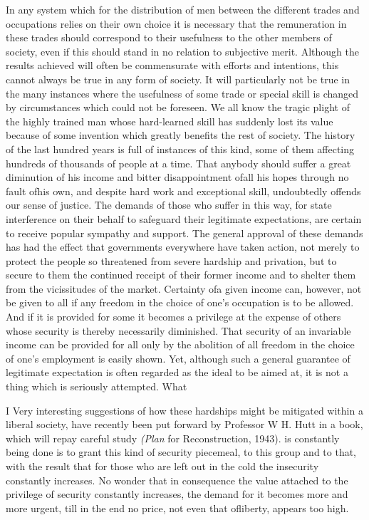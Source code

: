 \documentclass[11pt,openany]{book}
\begin{document}
In any system which for the distribution of men between the different trades and occupations relies on their own choice it is necessary that the remuneration in these trades should correspond to their usefulness to the other members of society, even if this should stand in no relation to subjective merit. Although the results achieved will often be commensurate with efforts and intentions, this cannot always be true in any form of society. It will particularly not be true in the many instances where the usefulness of some trade or special skill is changed by circumstances which could not be foreseen. We all know the tragic plight of the highly trained man whose hard-learned skill has suddenly lost its value because of some invention which greatly benefits the rest of society. The history of the last hundred years is full of instances of this kind, some of them affecting hundreds of thousands of people at a time. That anybody should suffer a great diminution of his income and bitter disappointment ofall his hopes through no fault ofhis own, and despite hard work and exceptional skill, undoubtedly offends our sense of justice. The demands of those who suffer in this way, for state interference on their behalf to safeguard their legitimate expectations, are certain to receive popular sympathy and support. The general approval of these demands has had the effect that governments everywhere have taken action, not merely to protect the people so threatened from severe hardship and privation, but to secure to them the continued receipt of their former income and to shelter them from the vicissitudes of the market. Certainty ofa given income can, however, not be given to all if any freedom in the choice of one's occupation is to be allowed. And if it is provided for some it becomes a privilege at the expense of others whose security is thereby necessarily diminished. That security of an invariable income can be provided for all only by the abolition of all freedom in the choice of one's employment is easily shown. Yet, although such a general guarantee of legitimate expectation is often regarded as the ideal to be aimed at, it is not a thing which is seriously attempted. What

I Very interesting suggestions of how these hardships might be mitigated within a liberal society, have recently been put forward by Professor W H. Hutt in a book, which will repay careful study \emph{(Plan} for Reconstruction, 1943). is constantly being done is to grant this kind of security piecemeal, to this group and to that, with the result that for those who are left out in the cold the insecurity constantly increases. No wonder that in consequence the value attached to the privilege of security constantly increases, the demand for it becomes more and more urgent, till in the end no price, not even that ofliberty, appears too high.
\end{document}

